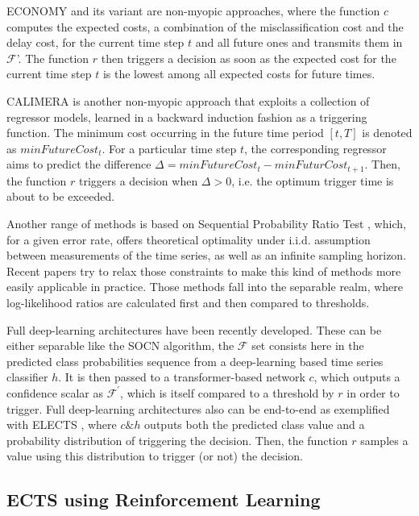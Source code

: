 \documentclass[sigconf, nonacm, table]{acmart}
\begin{document}
ECONOMY and its variant \cite{dachraoui2015early, tavenard2016cost, achenchabe2021early, zafar2021early} are non-myopic approaches, where the function $c$ computes the expected costs, a combination of the misclassification cost and the delay cost, for the current time step $t$ and all future ones and transmits them in $\mathcal{F}$'. The function $r$ then 
triggers a decision 
as soon as the expected cost for the current time step $t$ is the lowest among all expected costs for future times.

CALIMERA \cite{bilski2023calimera} is another non-myopic approach that exploits a collection of regressor models, learned in a backward induction fashion as a triggering function. The minimum cost occurring in the future time period $[t,T]$ is denoted as $minFutureCost_t$. For a particular time step $t$, the corresponding regressor aims to predict the difference $\Delta = minFutureCost_t - minFuturCost_{t+1}$. Then, the function $r$ triggers a decision when $\Delta > 0$, i.e. the optimum trigger time is about to be exceeded.



 
Another range of methods is based on Sequential Probability Ratio Test \cite{wald1948optimum}, which, for a given error rate, offers theoretical optimality under i.i.d. assumption between measurements of the time series, as well as an infinite sampling horizon. Recent papers \cite{ebihara2020sequential, ebihara2023toward, ringelearly} try to relax those constraints to make this kind of methods more easily applicable in practice. Those methods fall into the separable realm, where log-likelihood ratios are calculated first and then compared to thresholds.

Full deep-learning architectures have been recently developed. These can be either separable like the SOCN \cite{lv2023second} algorithm,  the $\mathcal{F}$ set consists here in the predicted class probabilities sequence from a deep-learning based time series classifier $h$. It is then passed to a transformer-based network $c$, which outputs a confidence scalar as $\mathcal{F}^{'}$, which is itself compared to a threshold by $r$ in order to trigger. Full deep-learning architectures also can be end-to-end as exemplified with ELECTS \cite{russwurm2023end}, where $c\&h$ outputs both the predicted class value and a probability distribution of triggering the decision. Then, the function $r$ samples a value using this distribution to trigger (or not) the decision.

\subsection{ECTS using Reinforcement Learning}
\end{document}
